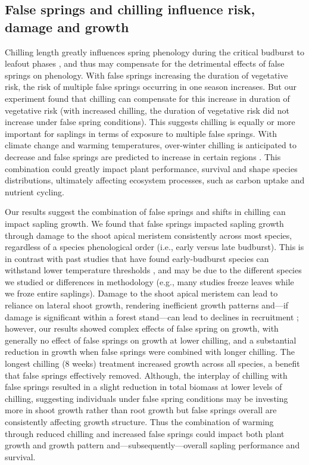 \documentclass{article}\usepackage[]{graphicx}\usepackage[]{color}
\begin{document}
\subsection*{False springs and chilling influence risk, damage and growth} 
Chilling length greatly influences spring phenology during the critical budburst to leafout phases \citep{Chuine2001, Laube2014}, and thus may compensate for the detrimental effects of false springs on phenology. With false springs increasing the duration of vegetative risk, the risk of multiple false springs occurring in one season increases. But our experiment found that chilling can compensate for this increase in duration of vegetative risk (with increased chilling, the duration of vegetative risk did not increase under false spring conditions). This suggests chilling is equally or more important for saplings in terms of exposure to multiple false springs. With climate change and warming temperatures, over-winter chilling is anticipated to decrease \citep{Laube2014} and false springs are predicted to increase in certain regions \citep{Ault2015, Liu2018}. This combination could greatly impact plant performance, survival and shape species distributions, ultimately affecting ecosystem processes, such as carbon uptake and nutrient cycling.
 
Our results suggest the combination of false springs and shifts in chilling can impact sapling growth. We found that false springs impacted sapling growth through damage to the shoot apical meristem consistently across most species, regardless of a species phenological order (i.e., early versus late budburst). This is in contrast with past studies that have found early-budburst species can withstand lower temperature thresholds \citep{Lenz2013, Muffler2016}, and may be due to the different species we studied or differences in methodology (e.g., many studies freeze leaves while we froze entire saplings). Damage to the shoot apical meristem can lead to reliance on lateral shoot growth, rendering inefficient growth patterns and---if damage is significant within a forest stand---can lead to declines in recruitment \citep{Rhodes2018}; however, our results showed complex effects of false spring on growth, with generally no effect of false springs on growth at lower chilling, and a substantial reduction in growth when false springs were combined with longer chilling. The longest chilling (8 weeks) treatment increased growth across all species, a benefit that false springs effectively removed. Although, the interplay of chilling with false springs resulted in a slight reduction in total biomass at lower levels of chilling, suggesting individuals under false spring conditions may be investing more in shoot growth rather than root growth but false springs overall are consistently affecting growth structure. Thus the combination of warming through reduced chilling and increased false springs could impact both plant growth and growth pattern and---subsequently---overall sapling performance and survival. 
  
\end{document}
